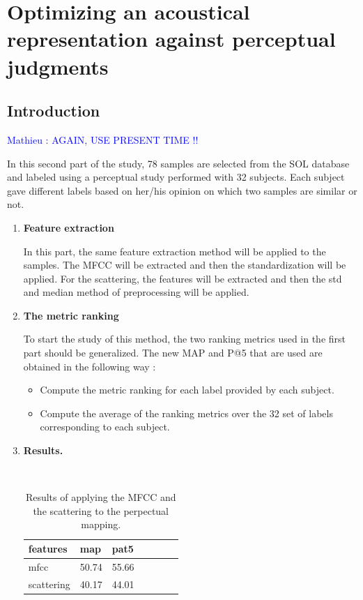 \documentclass[hidelinks,12pt]{report}
\newcommand{\ml}[1]{\textcolor{blue}{ Mathieu : #1}}
\begin{document}
\chapter{Optimizing an acoustical representation against perceptual judgments}
\section{Introduction}

\ml{AGAIN, USE PRESENT TIME !!}

In this second part of the study, 78 samples are selected from the SOL database and labeled using a perceptual study performed with 32 subjects. Each subject gave different labels based on her/his opinion on which two samples are similar or not. \par
\begin{enumerate}
\item \textbf{Feature extraction} \par
In this part, the same feature extraction method will be applied to the samples. The MFCC will be extracted and then the standardization will be applied. For the scattering, the features will be extracted and then the std and median method of preprocessing will be applied.




\item \textbf{The metric ranking} \par
To start the study of this method, the two ranking metrics used in the first part should be generalized. The new MAP and P@5 that are used are obtained in the following way :
 \begin{itemize}
\item Compute the metric ranking for each label provided by each subject.
\item Compute the average of the ranking metrics over the 32 set of labels corresponding to each subject.
\end{itemize}

\item \textbf{Results.}

\begin{table}[H]
\begin{center} 
\ 
 \setlength{\tabcolsep}{.16667em} 
\begin{tabular}{ | l | l | l | l | l | l | l |} 
\hline
features & map & pat5 \\ 
\hline 
mfcc &  50.74  & 55.66 \\ 
scattering & 40.17 & 44.01  \\ 
\hline
\end{tabular} 
\end{center} 
\caption{Results of applying the MFCC and the scattering to the perpectual mapping.} 
\label{ground truth} 
\end{table}
\end{enumerate}
\end{document}
